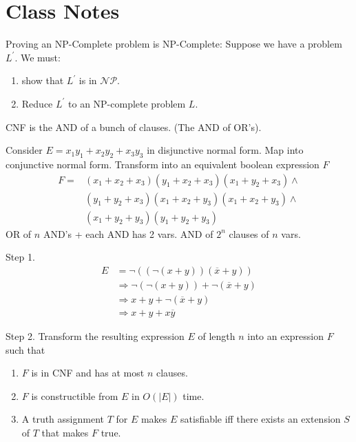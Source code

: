 \documentclass[]{article}
\begin{document}
\section*{Class Notes}
Proving an NP-Complete problem is NP-Complete:
Suppose we have a problem $L^\prime$. We must:
\begin{enumerate}
\item show that $L^\prime$ is in $\mathcal{NP}$.
\item Reduce $L^\prime$ to an NP-complete problem $L$.
\end{enumerate}
CNF is the AND of a bunch of clauses. (The AND of OR's).

Consider $E = x_1y_1 + x_2y_2 + x_3y_3$ in disjunctive normal form. Map into
conjunctive normal form. Transform into an equivalent boolean expression $F$
\begin{align*}
F = &(x_1+x_2+x_3)(y_1+x_2+x_3)(x_1+y_2+x_3)\wedge \\
    &(y_1+y_2+x_3)(x_1+x_2+y_3)(x_1+x_2+y_3)\wedge \\
    &(x_1+y_2+y_3)(y_1+y_2+y_3)
\end{align*}
OR of $n$ AND's + each AND has 2 vars. AND of $2^n$ clauses of $n$ vars.

Step 1.
\begin{align*}
E &= \neg((\neg(x+y))(\overline{x}+y)) \\
&\Rightarrow \neg(\neg(x+y))+\neg(\overline{x}+y) \\
&\Rightarrow x+y + \neg(\overline{x}+y) \\
&\Rightarrow x + y + x\overline{y}
\end{align*}

Step 2. Transform the resulting expression $E$ of length $n$ into an expression
$F$ such that
\begin{enumerate}
\item $F$ is in CNF and has at most $n$ clauses.
\item $F$ is constructible from $E$ in $O(|E|)$ time.
\item A truth assignment $T$ for $E$ makes $E$ satisfiable iff there exists an
extension $S$ of $T$ that makes $F$ true.
\end{enumerate}
\end{document}

